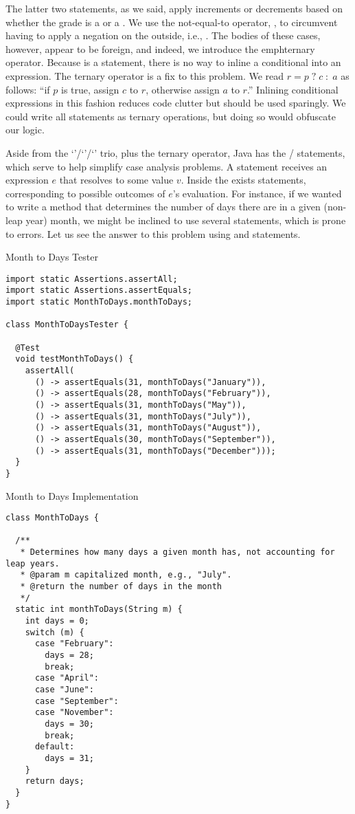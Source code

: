 The latter two  statements, as we said, apply increments or decrements based on whether the grade is a \ttt{+} or a \ttt{-}. We use the not-equal-to operator, \ttt{!=}, to circumvent having to apply a negation on the outside, i.e., . The bodies of these cases, however, appear to be foreign, and indeed, we introduce the emph{ternary operator}. Because  is a statement, there is no way to inline a conditional into an expression. The ternary operator is a fix to this problem. We read ${r = p\;?\;c\;:\;a}$ as follows: ``if $p$ is true, assign $c$ to $r$, otherwise assign $a$ to $r$.'' Inlining conditional expressions in this fashion reduces code clutter but should be used sparingly. We could write all  statements as ternary operations, but doing so would obfuscate our logic.

Aside from the `'/`'/`' trio, plus the ternary operator, Java has the / statements, which serve to help simplify case analysis problems. A  statement receives an expression $e$ that resolves to some value $v$. Inside the  exists  statements, corresponding to possible outcomes of $e$'s evaluation. For instance, if we wanted to write a method that determines the number of days there are in a given (non-leap year) month, we might be inclined to use several  statements, which is prone to errors. Let us see the answer to this problem using  and  statements.

\begin{cl}[]{Month to Days Tester}
\begin{lstlisting}[language=MyJava]
import static Assertions.assertAll;
import static Assertions.assertEquals;
import static MonthToDays.monthToDays;

class MonthToDaysTester {

  @Test
  void testMonthToDays() {
    assertAll(
      () -> assertEquals(31, monthToDays("January")),
      () -> assertEquals(28, monthToDays("February")),
      () -> assertEquals(31, monthToDays("May")),
      () -> assertEquals(31, monthToDays("July")),
      () -> assertEquals(31, monthToDays("August")),
      () -> assertEquals(30, monthToDays("September")),
      () -> assertEquals(31, monthToDays("December")));
  }
}
\end{lstlisting}
\end{cl}

\begin{cl}[]{Month to Days Implementation}
\begin{lstlisting}[language=MyJava]
class MonthToDays {

  /**
   * Determines how many days a given month has, not accounting for leap years.
   * @param m capitalized month, e.g., "July".
   * @return the number of days in the month
   */
  static int monthToDays(String m) {
    int days = 0;
    switch (m) {
      case "February":
        days = 28;
        break;
      case "April":
      case "June":
      case "September":
      case "November":
        days = 30;
        break;
      default:
        days = 31;
    }
    return days;
  }
}
\end{lstlisting}
\end{cl}

